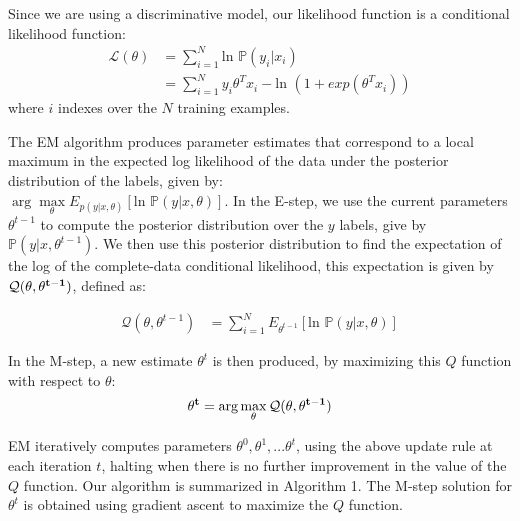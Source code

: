 Since we are using a discriminative model, our likelihood function is  a  conditional likelihood function:
  \begin{align}\label{eqlikelihood}
  \mathcal{L}(\theta)  &=\sum_{i=1}^{N} \mbox{ln }  \mathbb{P}(y_i|x_i)  \nonumber \\
     &= \sum_{i=1}^{N}  y_i \theta^{T}x_i - \mbox{ln } (1+ exp ( \theta^{T}x_i)) 
   \end{align}
where $i$ indexes over the $N$ training examples.
  
  

The  EM algorithm produces parameter estimates that correspond to a local maximum in the expected log likelihood of the data under the posterior distribution of the labels, given by: \\   $\arg\max\limits_{\theta}  E_{p(y|x,\theta)} [ \mbox{ln } \mathbb{P}(y|x,\theta)]$.  In the E-step, we use the current parameters $\theta^{t-1}$ to compute the posterior distribution over the $y$ labels, give by $\mathbb{P}(y|x, \theta^{t-1})$.   We then use this posterior distribution to find the expectation of the log of the complete-data conditional likelihood, this expectation is given by  $\mathcal{Q}({\bf\theta, \theta^{t-1})}$, defined as:

  \begin{align}
\mathcal{Q}(\theta,  \theta^{t-1})  &=\sum_{i=1}^{N} E_{\theta^{t-1}} [ \mbox{ln } \mathbb{P}(y|x,\theta)]  
    \end{align}

In the M-step, a new estimate $\theta^t$ is then produced, by maximizing this $Q$ function with respect to $\theta$:
\begin{equation} \label{empameterupdate}
{\bf \theta^{t}} =\arg\max\limits_{\theta}\mathcal{Q}({\bf\theta, \theta^{t-1})}
\end{equation}

EM iteratively computes  parameters $\theta^0, \theta^1, ...\theta^{t}$,  using the above update rule at each iteration $t$, halting when there is no further improvement in the value of the $Q$ function.  Our algorithm is summarized in Algorithm 1.  The M-step solution for $\theta^t$ is obtained using gradient ascent to maximize the $Q$ function.  


